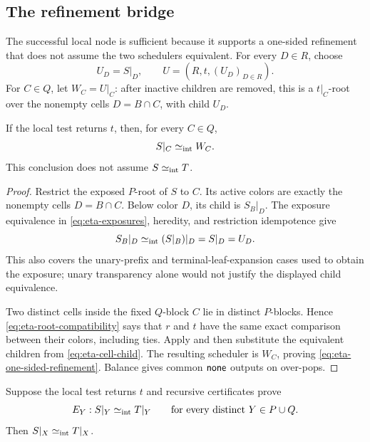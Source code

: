 \subsection{The refinement bridge}
\label{sec:eta-bridge}

The successful local node is sufficient because it supports a one-sided
refinement that does not assume the two schedulers equivalent.  For every
\(D\in R\), choose
\begin{equation}
 U_D=S|_D,
 \qquad
 U=(R,t,(U_D)_{D\in R}).
 \label{eq:eta-bridge-U}
\end{equation}
For \(C\in Q\), let \(W_C=U|_C\): after inactive children are removed, this
is a \(t|_C\)-root over the nonempty cells \(D=B\cap C\), with child \(U_D\).

\begin{lemma}
\label{lem:eta-one-sided-refinement}
If the local test returns \(t\), then, for every \(C\in Q\),
\begin{equation}
  S|_C\mathrel{\simeq_{\mathrm{int}}} W_C.
 \label{eq:eta-one-sided-refinement}
\end{equation}
This conclusion does not assume \(S\mathrel{\simeq_{\mathrm{int}}} T\).
\end{lemma}

\begin{proof}
Restrict the exposed \(P\)-root of \(S\) to \(C\).  Its active colors are
exactly the nonempty cells \(D=B\cap C\).  Below color \(D\), its child is
\(S_B|_D\).  The exposure equivalence in
\autoref{eq:eta-exposures}, heredity, and restriction idempotence give
\begin{equation}
  S_B|_D\mathrel{\simeq_{\mathrm{int}}} (S|_B)|_D=S|_D=U_D.
 \label{eq:eta-cell-child}
\end{equation}
This also covers the unary-prefix and terminal-leaf-expansion cases used to
obtain the exposure; unary transparency alone would not justify the displayed
child equivalence.

Two distinct cells inside the fixed \(Q\)-block \(C\) lie in distinct
\(P\)-blocks.  Hence \autoref{eq:eta-root-compatibility} says that \(r\) and
\(t\) have the same exact comparison between their colors, including ties.
Apply  and then substitute the equivalent children from
\autoref{eq:eta-cell-child}.  The resulting scheduler is \(W_C\), proving
\autoref{eq:eta-one-sided-refinement}.  Balance gives common \(\mathsf{none}\) outputs
on over-pops.
\end{proof}

\begin{lemma}
\label{lem:eta-successful-node}
Suppose the local test returns \(t\) and recursive certificates prove
\begin{equation}
 E_Y:S|_Y\mathrel{\simeq_{\mathrm{int}}} T|_Y
 \qquad\text{for every distinct }Y\in P\cup Q.
 \label{eq:eta-child-certificates}
\end{equation}
Then \(S|_X\mathrel{\simeq_{\mathrm{int}}} T|_X\).
\end{lemma}

